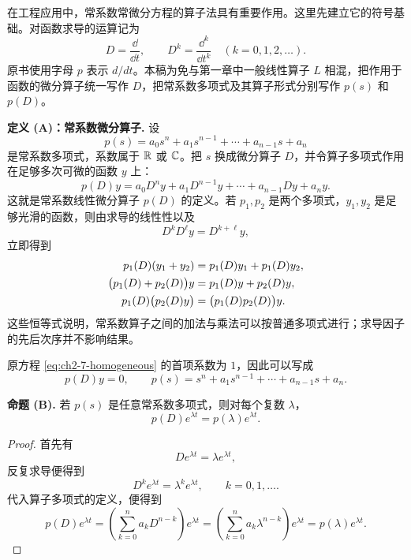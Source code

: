 在工程应用中，常系数常微分方程的算子法具有重要作用。这里先建立它的符号基础。对函数求导的运算记为
\[
 D=\frac{\dd}{\dd t},
 \qquad D^k=\frac{\dd^k}{\dd t^k}\quad(k=0,1,2,\ldots).
\]
原书使用字母 \(p\) 表示 \(d/dt\)。本稿为免与第一章中一般线性算子 \(L\) 相混，把作用于函数的微分算子统一写作 \(D\)，把常系数多项式及其算子形式分别写作 \(p(s)\) 和 \(p(D)\)。

\medskip
\noindent\textbf{定义 (A)：常系数微分算子.}
设
\begin{equation}
 p(s)=a_0s^n+a_1s^{n-1}+\cdots+a_{n-1}s+a_n
 \label{eq:ch2-7-polynomial}
\end{equation}
是常系数多项式，系数属于 \(\mathbb R\) 或 \(\mathbb C\)。把 \(s\) 换成微分算子 \(D\)，并令算子多项式作用在足够多次可微的函数 \(y\) 上：
\begin{equation}
 p(D)y
 =a_0D^ny+a_1D^{n-1}y+\cdots+a_{n-1}Dy+a_ny.
 \label{eq:ch2-7-operator-definition}
\end{equation}
这就是常系数线性微分算子 \(p(D)\) 的定义。若 \(p_1,p_2\) 是两个多项式，\(y_1,y_2\) 是足够光滑的函数，则由求导的线性性以及
\[
 D^kD^\ell y=D^{k+\ell}y,
\]
立即得到
\begin{align}
 p_1(D)(y_1+y_2)&=p_1(D)y_1+p_1(D)y_2,\notag\\
 \bigl(p_1(D)+p_2(D)\bigr)y&=p_1(D)y+p_2(D)y,
 \label{eq:ch2-7-operator-identities}\\
 p_1(D)\bigl(p_2(D)y\bigr)&=\bigl(p_1(D)p_2(D)\bigr)y.\notag
\end{align}
这些恒等式说明，常系数算子之间的加法与乘法可以按普通多项式进行；求导因子的先后次序并不影响结果。

原方程 \eqref{eq:ch2-7-homogeneous} 的首项系数为 \(1\)，因此可以写成
\begin{equation}
 p(D)y=0,
 \qquad
 p(s)=s^n+a_1s^{n-1}+\cdots+a_{n-1}s+a_n.
 \label{eq:ch2-7-Ly-zero}
\end{equation}

\medskip
\noindent\textbf{命题 (B).}
若 \(p(s)\) 是任意常系数多项式，则对每个复数 \(\lambda\)，
\begin{equation}
 p(D)e^{\lambda t}=p(\lambda)e^{\lambda t}.
 \label{eq:ch2-7-exponential-eigenfunction}
\end{equation}

\begin{proof}
首先有
\[
 De^{\lambda t}=\lambda e^{\lambda t},
\]
反复求导便得到
\[
 D^k e^{\lambda t}=\lambda^k e^{\lambda t},
 \qquad k=0,1,\ldots.
\]
代入算子多项式的定义，便得到
\[
 p(D)e^{\lambda t}
 =\left(\sum_{k=0}^n a_kD^{n-k}\right)e^{\lambda t}
 =\left(\sum_{k=0}^n a_k\lambda^{n-k}\right)e^{\lambda t}
 =p(\lambda)e^{\lambda t}.
\]
\end{proof}

